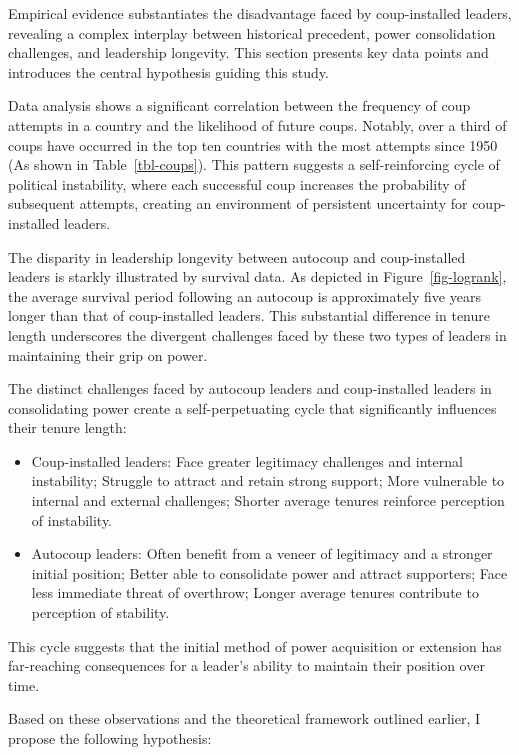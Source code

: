 \documentclass[
  12pt,
]{report}
\begin{document}
Empirical evidence substantiates the disadvantage faced by
coup-installed leaders, revealing a complex interplay between historical
precedent, power consolidation challenges, and leadership longevity.
This section presents key data points and introduces the central
hypothesis guiding this study.

Data analysis shows a significant correlation between the frequency of
coup attempts in a country and the likelihood of future coups. Notably,
over a third of coups have occurred in the top ten countries with the
most attempts since 1950 (As shown in Table~\ref{tbl-coups}). This
pattern suggests a self-reinforcing cycle of political instability,
where each successful coup increases the probability of subsequent
attempts, creating an environment of persistent uncertainty for
coup-installed leaders.

The disparity in leadership longevity between autocoup and
coup-installed leaders is starkly illustrated by survival data. As
depicted in Figure~\ref{fig-logrank}, the average survival period
following an autocoup is approximately five years longer than that of
coup-installed leaders. This substantial difference in tenure length
underscores the divergent challenges faced by these two types of leaders
in maintaining their grip on power.

The distinct challenges faced by autocoup leaders and coup-installed
leaders in consolidating power create a self-perpetuating cycle that
significantly influences their tenure length:

\begin{itemize}
\item
  Coup-installed leaders: Face greater legitimacy challenges and
  internal instability; Struggle to attract and retain strong support;
  More vulnerable to internal and external challenges; Shorter average
  tenures reinforce perception of instability.
\item
  Autocoup leaders: Often benefit from a veneer of legitimacy and a
  stronger initial position; Better able to consolidate power and
  attract supporters; Face less immediate threat of overthrow; Longer
  average tenures contribute to perception of stability.
\end{itemize}

This cycle suggests that the initial method of power acquisition or
extension has far-reaching consequences for a leader's ability to
maintain their position over time.

Based on these observations and the theoretical framework outlined
earlier, I propose the following hypothesis:
\end{document}
